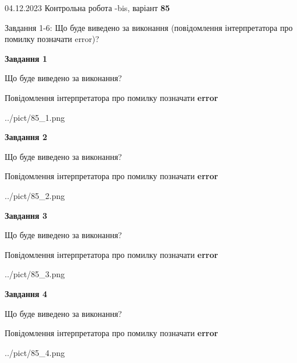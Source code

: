 \documentclass[12pt, ukrainian]{article}
\begin{document}
{{04.12.2023 Контрольна робота -bis, варіант  \No \textbf { 85 }\par}}
{

Завдання 1-6: Що буде виведено за виконання (повідомлення інтерпретатора про помилку позначати error)?


{\begin {center}\textbf{Завдання 1}\end {center}}\par
Що буде виведено за виконання? \par
Повідомлення інтерпретатора про помилку позначати \textbf{error}

\begin{center}
	{../pict/85_1.png}
\end{center}
\newpage

{\begin {center}\textbf{Завдання 2}\end {center}}\par
Що буде виведено за виконання? \par
Повідомлення інтерпретатора про помилку позначати \textbf{error}

\begin{center}
	{../pict/85_2.png}
\end{center}
\newpage

{\begin {center}\textbf{Завдання 3}\end {center}}\par
Що буде виведено за виконання? \par
Повідомлення інтерпретатора про помилку позначати \textbf{error}

\begin{center}
	{../pict/85_3.png}
\end{center}
\newpage

{\begin {center}\textbf{Завдання 4}\end {center}}\par
Що буде виведено за виконання? \par
Повідомлення інтерпретатора про помилку позначати \textbf{error}

\begin{center}
	{../pict/85_4.png}
\end{center}
\newpage

}
\end{document}
